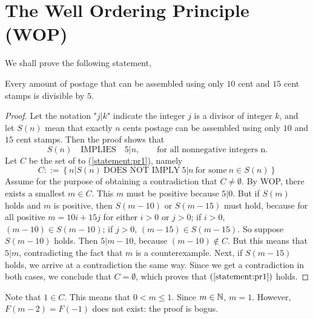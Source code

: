 \chapter{The Well Ordering Principle (WOP)}

\begin{pr}
    We shall prove the following statement,
    \begin{lemPr}
        Every amount of postage that can be assembled using only $10$ cent
        and $15$ cent stamps is divisible by $5$.
    \end{lemPr}

    \begin{proof}
        Let the notation "$j\left|\right.k$" indicate the integer $j$
        is a divisor of integer $k$, and let $S(n)$ mean that exactly $n$ cents
        postage can be assembled using only $10$ and $15$ cent stamps. Then
        the proof shows that
        \begin{equation} \label{statement:pr1}
            S(n) \quad \text{IMPLIES} \quad 5 \left|\right. n, \qquad \text{for all nonnegative integers n.}
        \end{equation}
        Let $C$ be the set of  to (\ref{statement:pr1}), namely
        \begin{equation*}
            C ::= \left\{ n \left|\right. S(n) \ \text{DOES NOT IMPLY} \ 5 \left|\right. n \ \text{for some} \ n \in S(n) \right\}
        \end{equation*}
        Assume for the purpose of obtaining a contradiction that $C \neq \emptyset$.
        By WOP, there exists a smallest $m \in C$. This $m$ must be positive
        because $5 \left|\right. 0$.
        \beautyBr
        But if $S(m)$ holds and $m$ is positive, then $S(m - 10)$ or $S(m - 15)$
        must hold, because for all positive $m = 10i + 15j$ for either $i > 0$ or $j > 0$; if
        $i > 0$, $(m - 10) \in S(m - 10)$; if $j > 0$, $(m - 15) \in S(m - 15)$.
        \beautyBr
        So suppose $S(m - 10)$ holds. Then $5 \left|\right. m - 10$, because $(m - 10) \notin C$.
        \beautyBr
        But this means that $5 \left|\right. m$, contradicting the fact that
        $m$ is a counterexample.
        \beautyBr
        Next, if $S(m - 15)$ holds, we arrive at a contradiction the same way.
        \beautyBr
        Since we get a contradiction in both cases, we conclude that $C = \emptyset$,
        which proves that $(\ref{statement:pr1})$ holds.
    \end{proof}
\end{pr}

\begin{pr}
    Note that $1 \in C$. This means that $0 < m \leq 1$. Since $m \in \mathbb{N}$,
    $m = 1$. However, $F(m - 2) = F(-1)$ does not exist: the proof is bogus.
\end{pr}

